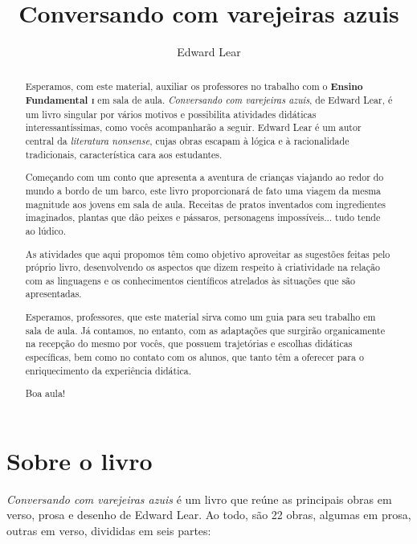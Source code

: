 \documentclass[11pt]{extarticle}
\newcommand{\AutorLivro}{Edward Lear}
\newcommand{\TituloLivro}{Conversando com varejeiras azuis}
\newcommand{\colaborador}{Renier Silva}
\begin{document}
\title{\TituloLivro}
\author{\AutorLivro}
\def\authornotes{\colaborador}

\date{}
\maketitle

\tableofcontents


\begin{abstract}

Esperamos, com este material,
auxiliar os professores no trabalho com o \textbf{Ensino Fundamental \textsc{i}} em 
sala de aula. \textit{Conversando com varejeiras azuis}, de Edward Lear, é um livro singular
por vários motivos e possibilita atividades didáticas interessantíssimas,
como vocês acompanharão a seguir. Edward Lear é um autor central da \textit{literatura nonsense}, cujas obras escapam à lógica e à racionalidade tradicionais, característica cara aos estudantes. 

Começando com um conto que apresenta a aventura de crianças viajando 
ao redor do mundo a bordo de um barco, este livro proporcionará de fato
uma viagem da mesma magnitude aos jovens em sala de aula. 
Receitas de pratos inventados com ingredientes imaginados, 
plantas que dão peixes e pássaros, personagens impossíveis...
tudo tende ao lúdico. 

As atividades que aqui propomos têm como objetivo aproveitar
as sugestões feitas pelo próprio livro, desenvolvendo 
os aspectos que dizem respeito à criatividade na relação
com as linguagens e os conhecimentos científicos atrelados 
às situações que são apresentadas. 

Esperamos, professores, que este material sirva como um guia 
para seu trabalho em sala de aula. Já contamos, no entanto, com as adaptações
que surgirão organicamente na recepção do mesmo por vocês, que possuem 
trajetórias e escolhas didáticas específicas, bem como no contato com os 
alunos, que tanto têm a oferecer para o enriquecimento da experiência didática.

Boa aula!

\end{abstract}

\section{Sobre o livro}

\textit{Conversando com varejeiras azuis} é um livro que reúne as principais
obras em verso, prosa e desenho de Edward Lear.
Ao todo, são 22 obras, algumas em prosa, outras em verso, divididas
em seis partes: 
\end{document}
